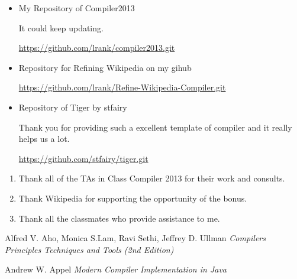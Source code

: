 \documentclass[preprint, 9pt]{sigplanconf}
\begin{document}
\begin{itemize}

    \item{My Repository of Compiler2013}

    It could keep updating.

    \hyperref[github]{https://github.com/lrank/compiler2013.git}

    \item{Repository for Refining Wikipedia on my gihub}

    \hyperref[github]{https://github.com/lrank/Refine-Wikipedia-Compiler.git}

    \item{Repository of Tiger by stfairy}

    Thank you for providing such a excellent template of compiler and it really helps us a lot.

    \hyperref[github]{https://github.com/stfairy/tiger.git}

\end{itemize}

\acks

\begin{enumerate}
    \item Thank all of the TAs in Class Compiler 2013 for their work and consults.

    \item Thank Wikipedia for supporting the opportunity of the bonus.

    \item Thank all the classmates who provide assistance to me.
\end{enumerate}



\begin{thebibliography}{10}
\softraggedright

Alfred V. Aho, Monica S.Lam, Ravi Sethi, Jeffrey D. Ullman \textit{Compilers Principles Techniques and Tools (2nd Edition)}

Andrew W. Appel
\textit{Modern Compiler Implementation in Java}

\end{thebibliography}
\end{document}
